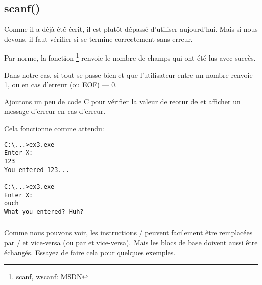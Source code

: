 \subsection{scanf()}

Comme il a déjà été écrit, il est plutôt dépassé d'utiliser \scanf aujourd'hui.
Mais si nous devons, il faut vérifier si \scanf se termine correctement sans erreur.



Par norme, la fonction \scanf\footnote{scanf, wscanf: \href{http://go.yurichev.com/17255}{MSDN}}
renvoie le nombre de champs qui ont été lus avec succès.

Dans notre cas, si tout se passe bien et que l'utilisateur entre un nombre \scanf
renvoie 1, ou en cas d'erreur (ou \ac{EOF}) --- 0.

Ajoutons un peu de code C pour vérifier la valeur de reotur de \scanf et afficher
un message d'erreur en cas d'erreur.

Cela fonctionne comme attendu:

\begin{lstlisting}
C:\...>ex3.exe
Enter X:
123
You entered 123...

C:\...>ex3.exe
Enter X:
ouch
What you entered? Huh?
\end{lstlisting}






\subsubsection{\Exercise}

Comme nous pouvons voir, les instructions / peuvent facilement
être remplacées par / et vice-versa (ou  par  et vice-versa).
Mais les blocs de base doivent aussi être échangés.
Essayez de faire cela pour quelques exemples.

